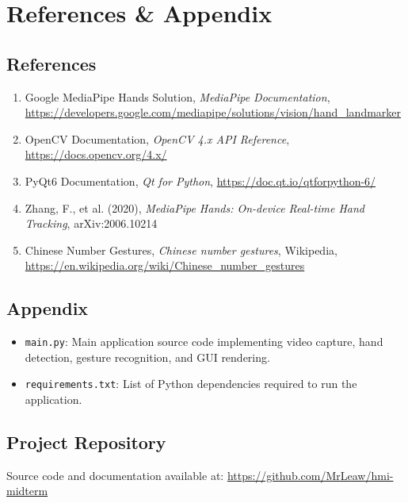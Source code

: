 \documentclass{article}
\begin{document}
\section{References \& Appendix}

\subsection*{References}

\begin{enumerate}
	\item Google MediaPipe Hands Solution, \textit{MediaPipe Documentation}, \url{https://developers.google.com/mediapipe/solutions/vision/hand\_landmarker}
	\item OpenCV Documentation, \textit{OpenCV 4.x API Reference}, \url{https://docs.opencv.org/4.x/}
	\item PyQt6 Documentation, \textit{Qt for Python}, \url{https://doc.qt.io/qtforpython-6/}
	\item Zhang, F., et al. (2020), \textit{MediaPipe Hands: On-device Real-time Hand Tracking}, arXiv:2006.10214
	\item Chinese Number Gestures, \textit{Chinese number gestures}, Wikipedia, \url{https://en.wikipedia.org/wiki/Chinese_number_gestures}
\end{enumerate}

\subsection*{Appendix}

\begin{itemize}
	\item \texttt{main.py}: Main application source code implementing video capture, hand detection, gesture recognition, and GUI rendering.
	\item \texttt{requirements.txt}: List of Python dependencies required to run the application.
\end{itemize}

\subsection*{Project Repository}

Source code and documentation available at: \url{https://github.com/MrLeaw/hmi-midterm}
\end{document}
